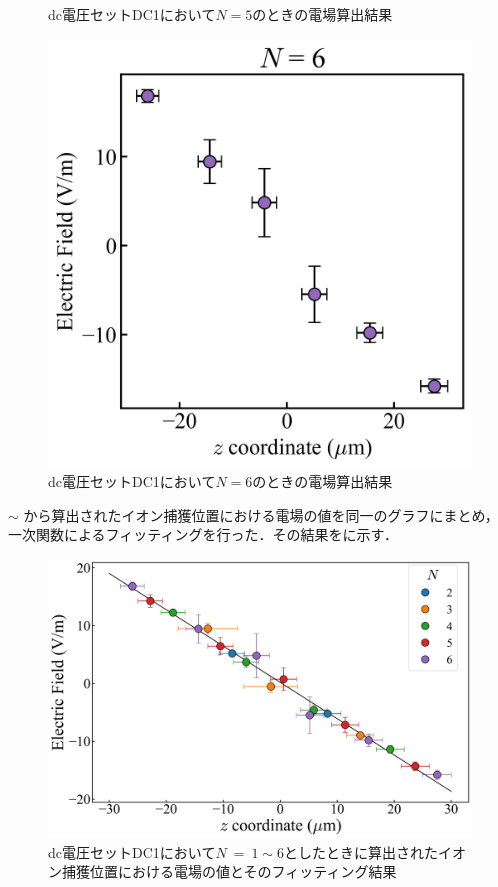 \begin{figure}[h]
\begin{minipage}{0.33\linewidth}
\begin{center}
			\caption{dc電圧セットDC1において$N=5$のときの電場算出結果}
			\label{fig:DC1_N5}
		\end{center}
	\end{minipage}
	\begin{minipage}{0.33\linewidth}
		\begin{center}
			\includegraphics[width = 0.9\columnwidth]{./results/figure/DC1_N6.jpg}
			\caption{dc電圧セットDC1において$N=6$のときの電場算出結果}
			\label{fig:DC1_N6}
		\end{center}
	\end{minipage}
\end{figure}

 $\sim$ から算出されたイオン捕獲位置における電場の値を同一のグラフにまとめ，一次関数によるフィッティングを行った．その結果をに示す．

\begin{figure}[h]
	\begin{center}
		\includegraphics[width = 0.6\linewidth]{./results/figure/DC1_E.jpg}
		\caption{dc電圧セットDC1において$N \ = \ 1 \sim 6$としたときに算出されたイオン捕獲位置における電場の値とそのフィッティング結果}
		\label{fig:DC1_E}
	\end{center}
\end{figure}

